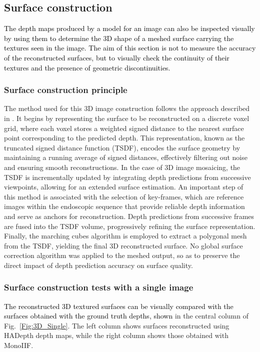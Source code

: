 \documentclass[a4paper,fleqn]{cas-dc}
\begin{document}
\subsection{Surface construction}
\label{sec:surface}


\textcolor{black}{The depth maps produced by a model for an image can also be inspected visually by using them to determine the 3D shape of a meshed surface carrying the textures seen in the image. The aim of this section is not to measure the accuracy of the reconstructed surfaces, but to visually check the continuity of their textures and the presence of geometric discontinuities.}

\subsubsection*{Surface construction principle}

The method used for this 3D image construction follows the approach described in \citep{Recasens_IEEERAL_2021}. It begins by representing the surface to be reconstructed on a discrete voxel grid, where each voxel stores a weighted signed distance to the nearest surface point corresponding to the predicted depth. This representation, known as the truncated signed distance function (TSDF), encodes the surface geometry by maintaining a running average of signed distances, effectively filtering out noise and ensuring smooth reconstructions. In the case of 3D image mosaicing, the TSDF is incrementally updated by integrating depth predictions from successive viewpoints, allowing for an extended surface estimation. An important step of this 
method is associated with the selection of key-frames, which are reference images within the endoscopic sequence that provide reliable depth information and serve as anchors for reconstruction. Depth predictions from successive frames are fused into the TSDF volume, progressively refining the surface representation. 
Finally, the marching cubes algorithm \citep{Lorensen_SIGGRAPH_1987} is employed to extract a polygonal mesh from the TSDF, yielding the final 3D reconstructed surface. No global surface correction algorithm was applied to the meshed output, so as to preserve the direct impact of depth prediction accuracy on surface quality.

\subsubsection*{Surface construction tests with a single image}
\textcolor{black}{The reconstructed 3D textured surfaces can be visually compared with the surfaces obtained with the ground truth depths, shown} in the central column of 
Fig.~\ref{Fig:3D_Single}. The left column shows surfaces reconstructed using HADepth depth maps, while the right column shows those obtained with MonoIIF.
\end{document}
